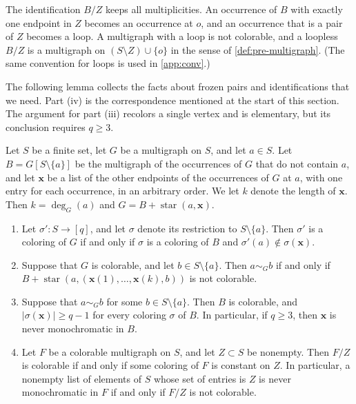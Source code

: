 The identification $B/Z$ keeps all multiplicities. An occurrence of $B$ with exactly one endpoint in $Z$ becomes an occurrence at $o$, and an occurrence that is a pair of $Z$ becomes a loop. A multigraph with a loop is not colorable, and a loopless $B/Z$ is a multigraph on $(S \setminus Z) \cup \{o\}$ in the sense of \cref{def:pre-multigraph}. (The same convention for loops is used in \cref{app:conv}.)

The following lemma collects the facts about frozen pairs and identifications that we need. Part (iv) is the correspondence mentioned at the start of this section. The argument for part (iii) recolors a single vertex and is elementary, but its conclusion requires $q \ge 3$.

\begin{lemma}\label{lem:low-frozen}
Let $S$ be a finite set, let $G$ be a multigraph on $S$, and let $a \in S$. Let $B = G[S \setminus \{a\}]$ be the multigraph of the occurrences of $G$ that do not contain $a$, and let $\mathbf x$ be a list of the other endpoints of the occurrences of $G$ at $a$, with one entry for each occurrence, in an arbitrary order. We let $k$ denote the length of $\mathbf x$. Then $k = \deg_G(a)$ and $G = B + \operatorname{star}(a, \mathbf x)$.
\begin{enumerate}[label=(\roman*)]
\item Let $\sigma'\colon S \to [q]$, and let $\sigma$ denote its restriction to $S \setminus \{a\}$. Then $\sigma'$ is a coloring of $G$ if and only if $\sigma$ is a coloring of $B$ and $\sigma'(a) \notin \sigma(\mathbf x)$.
\item Suppose that $G$ is colorable, and let $b \in S \setminus \{a\}$. Then $a \sim_G b$ if and only if $B + \operatorname{star}(a, (\mathbf x(1), \dots, \mathbf x(k), b))$ is not colorable.
\item Suppose that $a \sim_G b$ for some $b \in S \setminus \{a\}$. Then $B$ is colorable, and $|\sigma(\mathbf x)| \ge q - 1$ for every coloring $\sigma$ of $B$. In particular, if $q \ge 3$, then $\mathbf x$ is never monochromatic in $B$.
\item Let $F$ be a colorable multigraph on $S$, and let $Z \subset S$ be nonempty. Then $F/Z$ is colorable if and only if some coloring of $F$ is constant on $Z$. In particular, a nonempty list of elements of $S$ whose set of entries is $Z$ is never monochromatic in $F$ if and only if $F/Z$ is not colorable.
\end{enumerate}
\end{lemma}

